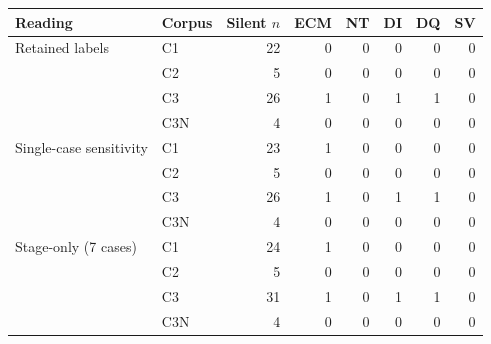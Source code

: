 \begin{tabular}{llrrrrrr}
\toprule
Reading & Corpus & Silent $n$ & ECM & NT & DI & DQ & SV \\
\midrule
Retained labels & C1 & 22 & 0 & 0 & 0 & 0 & 0 \\
 & C2 & 5 & 0 & 0 & 0 & 0 & 0 \\
 & C3 & 26 & 1 & 0 & 1 & 1 & 0 \\
 & C3N & 4 & 0 & 0 & 0 & 0 & 0 \\
Single-case sensitivity & C1 & 23 & 1 & 0 & 0 & 0 & 0 \\
 & C2 & 5 & 0 & 0 & 0 & 0 & 0 \\
 & C3 & 26 & 1 & 0 & 1 & 1 & 0 \\
 & C3N & 4 & 0 & 0 & 0 & 0 & 0 \\
Stage-only (7 cases) & C1 & 24 & 1 & 0 & 0 & 0 & 0 \\
 & C2 & 5 & 0 & 0 & 0 & 0 & 0 \\
 & C3 & 31 & 1 & 0 & 1 & 1 & 0 \\
 & C3N & 4 & 0 & 0 & 0 & 0 & 0 \\
\bottomrule
\end{tabular}
